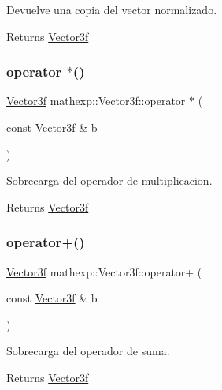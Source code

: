 Devuelve una copia del vector normalizado. 

\begin{DoxyReturn}{Returns}
\mbox{\hyperlink{structmathexp_1_1_vector3f}{Vector3f}} 
\end{DoxyReturn}
\mbox{\label{structmathexp_1_1_vector3f_aded79f82d971ef0abfc8c521f732aec8}} 
\subsubsection{\texorpdfstring{operator $\ast$()}{operator *()}}
{\footnotesize\ttfamily \mbox{\hyperlink{structmathexp_1_1_vector3f}{Vector3f}} mathexp\+::\+Vector3f\+::operator $\ast$ (\begin{DoxyParamCaption}\item[{const \mbox{\hyperlink{structmathexp_1_1_vector3f}{Vector3f}} \&}]{b }\end{DoxyParamCaption})}



Sobrecarga del operador de multiplicacion. 

\begin{DoxyReturn}{Returns}
\mbox{\hyperlink{structmathexp_1_1_vector3f}{Vector3f}} 
\end{DoxyReturn}
\mbox{\label{structmathexp_1_1_vector3f_a636ba939722da9cc20bb583322305f66}} 
\subsubsection{\texorpdfstring{operator+()}{operator+()}}
{\footnotesize\ttfamily \mbox{\hyperlink{structmathexp_1_1_vector3f}{Vector3f}} mathexp\+::\+Vector3f\+::operator+ (\begin{DoxyParamCaption}\item[{const \mbox{\hyperlink{structmathexp_1_1_vector3f}{Vector3f}} \&}]{b }\end{DoxyParamCaption})}



Sobrecarga del operador de suma. 

\begin{DoxyReturn}{Returns}
\mbox{\hyperlink{structmathexp_1_1_vector3f}{Vector3f}} 
\end{DoxyReturn}
\mbox{\label{structmathexp_1_1_vector3f_a14d6396a9c8ebd2b27f8ad3d0f588795}} 
